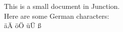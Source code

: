 \documentclass{article}
\begin{document}
This is a small document in Junction.
\\
Here are some German characters:
\\
äÄ öÖ üÜ ß
\end{document}
